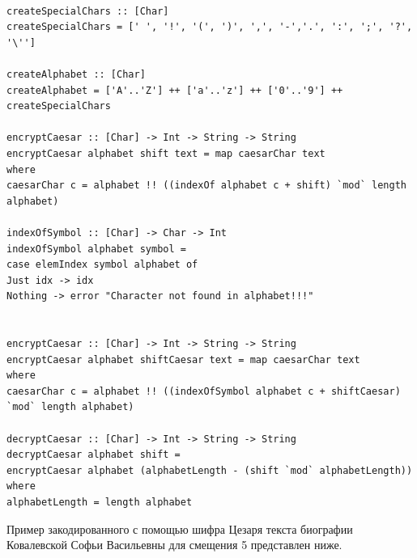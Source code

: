 \documentclass[11pt,a4paper,final]{article} %
\begin{document}
\begin{lstlisting}[caption={Функции для кодирования и декодирования текста с помощью шифра Цезаря.}, label={lst:l1}]
	
createSpecialChars :: [Char]
createSpecialChars = [' ', '!', '(', ')', ',', '-','.', ':', ';', '?', '\'']

createAlphabet :: [Char]
createAlphabet = ['A'..'Z'] ++ ['a'..'z'] ++ ['0'..'9'] ++ createSpecialChars

encryptCaesar :: [Char] -> Int -> String -> String
encryptCaesar alphabet shift text = map caesarChar text
where
caesarChar c = alphabet !! ((indexOf alphabet c + shift) `mod` length alphabet)        

indexOfSymbol :: [Char] -> Char -> Int
indexOfSymbol alphabet symbol = 
case elemIndex symbol alphabet of
Just idx -> idx
Nothing -> error "Character not found in alphabet!!!"


encryptCaesar :: [Char] -> Int -> String -> String
encryptCaesar alphabet shiftCaesar text = map caesarChar text
where 
caesarChar c = alphabet !! ((indexOfSymbol alphabet c + shiftCaesar) `mod` length alphabet)

decryptCaesar :: [Char] -> Int -> String -> String
decryptCaesar alphabet shift = 
encryptCaesar alphabet (alphabetLength - (shift `mod` alphabetLength)) 
where
alphabetLength = length alphabet
\end{lstlisting}

Пример закодированного с помощью шифра Цезаря текста биографии Ковалевской Софьи Васильевны для смещения 5 представлен ниже.
\end{document}
